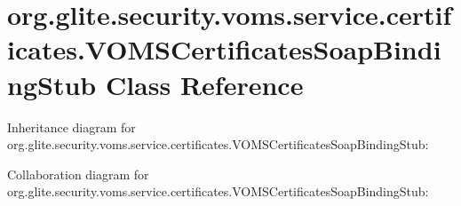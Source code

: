 \hypertarget{classorg_1_1glite_1_1security_1_1voms_1_1service_1_1certificates_1_1VOMSCertificatesSoapBindingStub}{
\section{org.glite.security.voms.service.certificates.VOMSCertificatesSoapBindingStub Class Reference}
\label{classorg_1_1glite_1_1security_1_1voms_1_1service_1_1certificates_1_1VOMSCertificatesSoapBindingStub}
}


Inheritance diagram for org.glite.security.voms.service.certificates.VOMSCertificatesSoapBindingStub:


Collaboration diagram for org.glite.security.voms.service.certificates.VOMSCertificatesSoapBindingStub:
